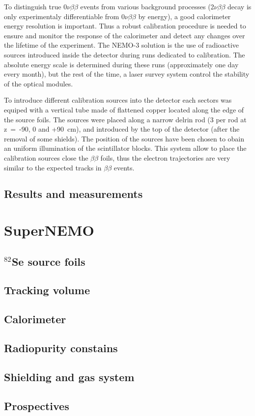 \documentclass[main.tex]{subfiles}
\begin{document}
\NI To distinguish true 0$\nu\beta\beta$ events from various background processes (2$\nu\beta\beta$ decay is only experimentaly differentiable from 0$\nu\beta\beta$ by energy), a good calorimeter energy resolution is important. Thus a robust calibration procedure is needed to ensure and monitor the response of the calorimeter and detect any changes over the lifetime of the experiment. The NEMO-3 solution is the use of radioactive sources introduced inside the detector during runs dedicated to calibration. The absolute energy scale is determined during these runs (approximately one day every month), but the rest of the time, a laser survey system control the stability of the optical modules. 


\bigskip


\NI To introduce different calibration sources into the detector each sectors was equiped with a vertical tube made of flattened copper located along the edge of the source foils. The sources were placed along a narrow delrin rod (3 per rod at z~=~-90, 0 and +90~cm), and introduced by the top of the detector (after the removal of some shields). The position of the sources have been chosen to obain an uniform illumination of the scintillator blocks. This system allow to place the calibration sources close the $\beta\beta$ foils, thus the electron trajectories are very similar to the expected tracks in $\beta\beta$ events.


\bigskip


\NI 






\subsection{Results and measurements}

\section{SuperNEMO}\label{sec:SuperNEMO}
\subsection{$^{\text{82}}$Se source foils}
\subsection{Tracking volume}
\subsection{Calorimeter}
\subsection{Radiopurity constains}
\subsection{Shielding and gas system}
\subsection{Prospectives}
\end{document}
